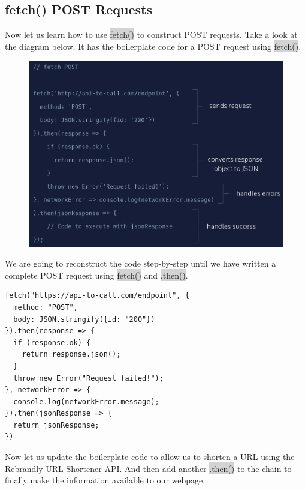 \documentclass[11pt]{article}
\begin{document}
\newpage
\subsection{fetch() POST Requests}
Now let us  learn how to use \colorbox{lightgray}{fetch()} to construct POST requests. Take a look at the diagram below. It has the boilerplate code for a POST request using \colorbox{lightgray}{fetch()}.
\begin{figure}[H]
\includegraphics[scale = 0.35]{18_3}
\centering
\end{figure}
We are going to reconstruct the code step-by-step until we have written a complete POST request using \colorbox{lightgray}{fetch()} and \colorbox{lightgray}{.then()}.
\begin{lstlisting}
fetch("https://api-to-call.com/endpoint", {
  method: "POST", 
  body: JSON.stringify({id: "200"})
}).then(response => {
  if (response.ok) {
    return response.json(); 
  }
  throw new Error("Request failed!"); 
}, networkError => {
  console.log(networkError.message);
}).then(jsonResponse => {
  return jsonResponse; 
})
\end{lstlisting}
Now let us update the boilerplate code to allow us to shorten a URL using the \href{https://developers.rebrandly.com/docs}{Rebrandly URL Shortener API}. And then add another \colorbox{lightgray}{.then()} to the chain to finally make the information available to our webpage.
\end{document}
